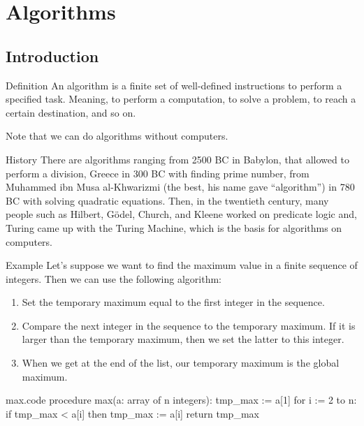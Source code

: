 \documentclass[a4paper]{article}
\begin{document}
\section{Algorithms}
\subsection{Introduction}
\begin{parag}{Definition}
    An algorithm is a finite set of well-defined instructions to perform a specified task. Meaning, to perform a computation, to solve a problem, to reach a certain destination, and so on.

    Note that we can do algorithms without computers.
\end{parag}

\begin{parag}{History}
    There are algorithms ranging from 2500 BC in Babylon, that allowed to perform a division, Greece in 300 BC with finding prime number, from Muhammed ibn Musa al-Khwarizmi (the best, his name gave ``algorithm'') in 780 BC with solving quadratic equations. Then, in the twentieth century, many people such as Hilbert, Gödel, Church, and Kleene worked on predicate logic and, Turing came up with the Turing Machine, which is the basis for algorithms on computers.
\end{parag}

\begin{parag}{Example}
    Let's suppose we want to find the maximum value in a finite sequence of integers. Then we can use the following algorithm:
   \begin{enumerate}
       \item Set the temporary maximum equal to the first integer in the sequence.
       \item Compare the next integer in the sequence to the temporary maximum. If it is larger than the temporary maximum, then we set the latter to this integer.
       \item When we get at the end of the list, our temporary maximum is the global maximum.
   \end{enumerate}
\end{parag}

\begin{filecontents*}[overwrite]{max.code}
procedure max(a: array of n integers):
    tmp_max := a[1]
    for i := 2 to n:
        if tmp_max < a[i] then tmp_max := a[i]
    return tmp_max
\end{filecontents*}
\end{document}
